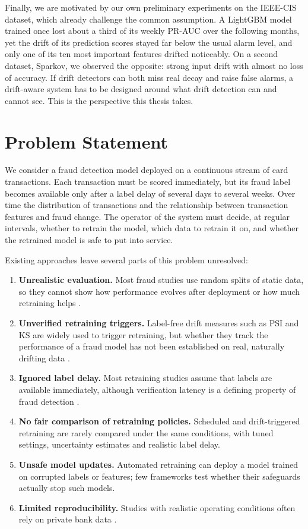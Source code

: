 Finally, we are motivated by our own preliminary experiments on the IEEE-CIS dataset, which already challenge the common assumption. A LightGBM model trained once lost about a third of its weekly PR-AUC over the following months, yet the drift of its prediction scores stayed far below the usual alarm level, and only one of its ten most important features drifted noticeably. On a second dataset, Sparkov, we observed the opposite: strong input drift with almost no loss of accuracy. If drift detectors can both miss real decay and raise false alarms, a drift-aware system has to be designed around what drift detection can and cannot see. This is the perspective this thesis takes.

\section{Problem Statement}

We consider a fraud detection model deployed on a continuous stream of card transactions. Each transaction must be scored immediately, but its fraud label becomes available only after a label delay of several days to several weeks. Over time the distribution of transactions and the relationship between transaction features and fraud change. The operator of the system must decide, at regular intervals, whether to retrain the model, which data to retrain it on, and whether the retrained model is safe to put into service.

Existing approaches leave several parts of this problem unresolved:

\begin{enumerate}
  \item \textbf{Unrealistic evaluation.} Most fraud studies use random splits of static data, so they cannot show how performance evolves after deployment or how much retraining helps \cite{abdelnaby2023,mienye2023}.
  \item \textbf{Unverified retraining triggers.} Label-free drift measures such as PSI and KS are widely used to trigger retraining, but whether they track the performance of a fraud model has not been established on real, naturally drifting data \cite{shakil2025,wong2025}.
  \item \textbf{Ignored label delay.} Most retraining studies assume that labels are available immediately, although verification latency is a defining property of fraud detection \cite{dalpozzolo2018,amekoe2024}.
  \item \textbf{No fair comparison of retraining policies.} Scheduled and drift-triggered retraining are rarely compared under the same conditions, with tuned settings, uncertainty estimates and realistic label delay.
  \item \textbf{Unsafe model updates.} Automated retraining can deploy a model trained on corrupted labels or features; few frameworks test whether their safeguards actually stop such models.
  \item \textbf{Limited reproducibility.} Studies with realistic operating conditions often rely on private bank data \cite{dalpozzolo2018,somasundaram2019,aldaoud2025}.
\end{enumerate}

